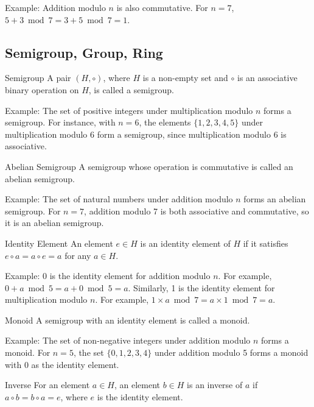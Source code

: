 \documentclass{article}
\begin{document}
Example: Addition modulo $n$ is also commutative. For $n = 7$, $5 + 3 \bmod 7 = 3 + 5 \bmod 7 = 1$.

\subsection{Semigroup, Group, Ring}

\begin{definition}{Semigroup}{}
A pair $(H, \circ)$, where $H$ is a non-empty set and $\circ$ is an associative binary operation on $H$, is called a semigroup.
\end{definition}

Example: The set of positive integers under multiplication modulo $n$ forms a semigroup. For instance, with $n = 6$, the elements $\{1, 2, 3, 4, 5\}$ under multiplication modulo 6 form a semigroup, since multiplication modulo 6 is associative.

\begin{definition}{Abelian Semigroup}{}
A semigroup whose operation is commutative is called an abelian semigroup.
\end{definition}

Example: The set of natural numbers under addition modulo $n$ forms an abelian semigroup. For $n = 7$, addition modulo 7 is both associative and commutative, so it is an abelian semigroup.

\begin{definition}{Identity Element}{}
An element $e \in H$ is an identity element of $H$ if it satisfies $e \circ a = a \circ e = a$ for any $a \in H$.
\end{definition}

Example: 0 is the identity element for addition modulo $n$. For example, $0 + a \bmod 5 = a + 0 \bmod 5 = a$. Similarly, 1 is the identity element for multiplication modulo $n$. For example, $1 \times a \bmod 7 = a \times 1 \bmod 7 = a$.

\begin{definition}{Monoid}{}
A semigroup with an identity element is called a monoid.
\end{definition}

Example: The set of non-negative integers under addition modulo $n$ forms a monoid. For $n = 5$, the set $\{0, 1, 2, 3, 4\}$ under addition modulo 5 forms a monoid with 0 as the identity element.

\begin{definition}{Inverse}{}
For an element $a \in H$, an element $b \in H$ is an inverse of $a$ if $a \circ b = b \circ a = e$, where $e$ is the identity element.
\end{definition}
\end{document}
